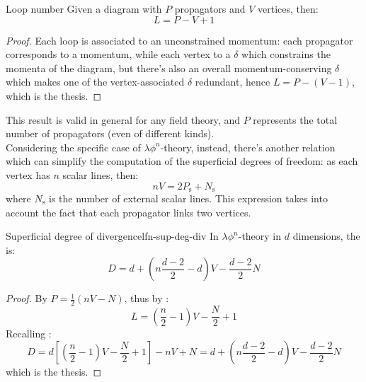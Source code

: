 \begin{lemma}{Loop number}{}
  Given a diagram with $ P $ propagators and $ V $ vertices, then:
  \begin{equation}
    L = P - V + 1
    \label{eq:loop-num}
  \end{equation}
\end{lemma}

\begin{proofbox}
  \begin{proof}
    Each loop is associated to an unconstrained momentum: each propagator corresponds to a momentum, while each vertex to a $ \delta $ which constrains the momenta of the diagram, but there's also an overall momentum-conserving $ \delta $ which makes one of the vertex-associated $ \delta $ redundant, hence $ L = P - (V - 1) $, which is the thesis.
  \end{proof}
\end{proofbox}

This result is valid in general for any field theory, and $ P $ represents the total number of propagators (even of different kinds). \\
Considering the specific case of $ \lambda \phi^n $-theory, instead, there's another relation which can simplify the computation of the superficial degrees of freedom: as each vertex has $ n $ scalar lines, then:
\begin{equation}
  n V = 2 P_\text{s} + N_\text{s}
  \label{eq:fn-v}
\end{equation}
where $ N_\text{s} $ is the number of external scalar lines. This expression takes into account the fact that each propagator links two vertices.

\begin{theorem}{Superficial degree of divergence}{lfn-sup-deg-div}
  In $ \lambda \phi^n $-theory in $ d $ dimensions, the  is:
    \begin{equation}
      D = d + \left( n \frac{d - 2}{2} - d \right) V - \frac{d - 2}{2} N
      \label{eq:lfn-sup-deg-div}
    \end{equation}
\end{theorem}

\begin{proofbox}
  \begin{proof}
    By  $ P = \frac{1}{2} (n V - N) $, thus by :
    \begin{equation*}
      L = \left( \frac{n}{2} - 1 \right) V - \frac{N}{2} + 1
    \end{equation*}
    Recalling :
    \begin{equation*}
      D = d \left[ \left( \frac{n}{2} - 1 \right) V - \frac{N}{2} + 1 \right] - n V + N = d + \left( n \frac{d - 2}{2} - d \right) V - \frac{d - 2}{2} N
    \end{equation*}
    which is the thesis.
  \end{proof}
\end{proofbox}

